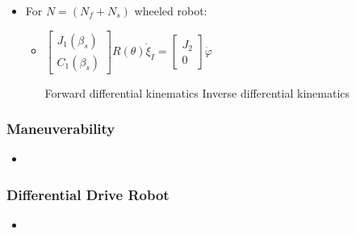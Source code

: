 \begin{itemize}
    \item For $N = (N_f + N_s)$ wheeled robot:
        \\ 
        \begin{itemize}
             $J_1(\beta_s) R(\theta) \dot \xi_I - J_2 \dot \varphi = 0$
             $C_1(\beta_s) R(\theta) \dot \xi_I = 0$
            \item $
                \begin{bmatrix}
                    J_1(\beta_s)\\
                    C_1(\beta_s)
                \end{bmatrix} R(\theta) \dot \xi_I =
                \begin{bmatrix}
                    J_2\\
                    0
                \end{bmatrix} \dot \varphi$
                \begin{itemize}
                     Forward differential kinematics
                     Inverse differential kinematics
                \end{itemize}
        \end{itemize}
\end{itemize}

\subsubsection{Maneuverability}
\begin{itemize}
     $\delta_M = \delta_m + \delta_s$ 
     Deg. of mobility
     Def. of steerability
    \item {}
\end{itemize}

\subsubsection{Differential Drive Robot}
\begin{itemize}
    \item 
\end{itemize}

